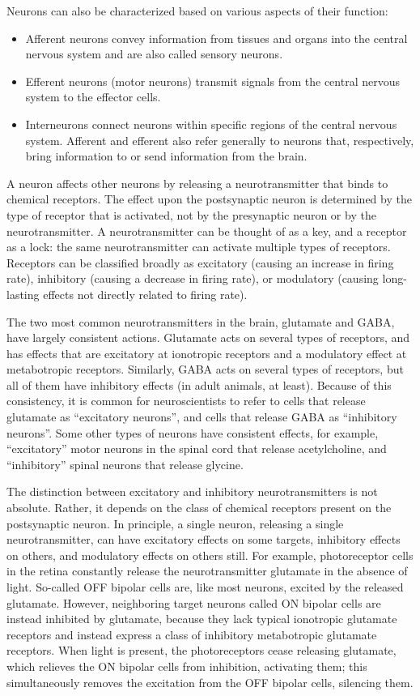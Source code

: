 Neurons can also be characterized based on various aspects of their function:

\begin{itemize}
\tightlist
\item
  Afferent neurons convey information from tissues and organs into the central nervous system and are also called sensory neurons.
\item
  Efferent neurons (motor neurons) transmit signals from the central nervous system to the effector cells.
\item
  Interneurons connect neurons within specific regions of the central nervous system.
  Afferent and efferent also refer generally to neurons that, respectively, bring information to or send information from the brain.
\end{itemize}

A neuron affects other neurons by releasing a neurotransmitter that binds to chemical receptors. The effect upon the postsynaptic neuron is determined by the type of receptor that is activated, not by the presynaptic neuron or by the neurotransmitter. A neurotransmitter can be thought of as a key, and a receptor as a lock: the same neurotransmitter can activate multiple types of receptors. Receptors can be classified broadly as excitatory (causing an increase in firing rate), inhibitory (causing a decrease in firing rate), or modulatory (causing long-lasting effects not directly related to firing rate).

The two most common neurotransmitters in the brain, glutamate and GABA, have largely consistent actions. Glutamate acts on several types of receptors, and has effects that are excitatory at ionotropic receptors and a modulatory effect at metabotropic receptors. Similarly, GABA acts on several types of receptors, but all of them have inhibitory effects (in adult animals, at least). Because of this consistency, it is common for neuroscientists to refer to cells that release glutamate as ``excitatory neurons'', and cells that release GABA as ``inhibitory neurons''. Some other types of neurons have consistent effects, for example, ``excitatory'' motor neurons in the spinal cord that release acetylcholine, and ``inhibitory'' spinal neurons that release glycine.

The distinction between excitatory and inhibitory neurotransmitters is not absolute. Rather, it depends on the class of chemical receptors present on the postsynaptic neuron. In principle, a single neuron, releasing a single neurotransmitter, can have excitatory effects on some targets, inhibitory effects on others, and modulatory effects on others still. For example, photoreceptor cells in the retina constantly release the neurotransmitter glutamate in the absence of light. So-called OFF bipolar cells are, like most neurons, excited by the released glutamate. However, neighboring target neurons called ON bipolar cells are instead inhibited by glutamate, because they lack typical ionotropic glutamate receptors and instead express a class of inhibitory metabotropic glutamate receptors. When light is present, the photoreceptors cease releasing glutamate, which relieves the ON bipolar cells from inhibition, activating them; this simultaneously removes the excitation from the OFF bipolar cells, silencing them.

